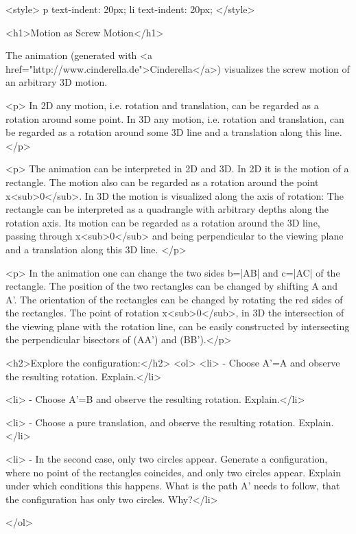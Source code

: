 <style>
p {
  text-indent: 20px;
}
li {
  text-indent: 20px;
}
</style>

<h1>Motion as Screw Motion</h1> 


The  animation (generated with  <a href="http://www.cinderella.de">Cinderella</a>) visualizes the screw motion of an arbitrary 3D motion. 
    
<p> In 2D any motion, i.e. rotation and translation, can be regarded as a rotation around some point. In 3D any motion, i.e. rotation and translation, can be regarded as a rotation around some 3D line and a translation along this line. 
</p>


<p> The animation can be interpreted in 2D and 3D. In 2D it is the motion of a rectangle. The motion also can be regarded as a rotation around the point x<sub>0</sub>. In 3D the motion is visualized along the axis of rotation: The rectangle can be interpreted as a quadrangle with arbitrary depths along the rotation axis. Its motion can be regarded as a rotation around the 3D line, passing through x<sub>0</sub> and being perpendicular to the viewing plane and a translation along this 3D line. </p>

<p> In the animation one can change the two sides b=|AB| and c=|AC| of the rectangle. The position of the two rectangles can be changed by shifting A and A'. The orientation of the rectangles can be changed by rotating the red sides of the rectangles. The point of rotation x<sub>0</sub>, in 3D the intersection of the viewing plane with the rotation line, can be easily constructed by intersecting the perpendicular bisectors of (AA') and (BB').</p>

    

    <h2>Explore the configuration:</h2>
    <ol>
      <li>  - Choose A'=A and observe the resulting rotation. Explain.</li>
			
      <li>  - Choose A'=B and observe the resulting rotation. Explain.</li>
			
 			
 			<li>  - Choose a pure translation, and observe the resulting rotation. Explain.</li>
			
			
			<li>  - In the second case, only two circles appear. Generate a configuration, where no point of the rectangles coincides, and only two circles appear. Explain under which conditions this happens. What is the path A' needs to follow, that the configuration has only two circles. Why?</li>
			
			
 			
	    
	        </ol>
